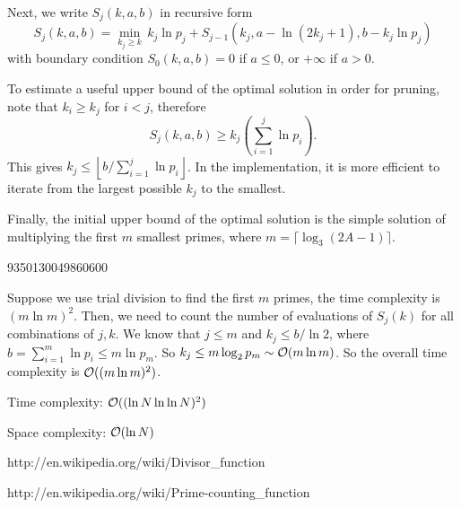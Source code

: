 Next, we write $S_j(k,a,b)$ in recursive form
\[
S_j(k,a,b) = \min_{k_j \ge k} \, k_j \ln p_j + S_{j-1}(k_j, a - \ln(2k_j+1), b-k_j \ln p_j)
\]
with boundary condition $S_0(k,a,b) = 0$ if $a \le 0$, or $+\infty$ if $a>0$.

To estimate a useful upper bound of the optimal solution in order for pruning, note that $k_i \ge k_j$ for $i < j$, therefore
\[
\textstyle
S_j(k,a,b) \ge k_j \left(\sum_{i=1}^{j} \ln p_i\right) .
\]
This gives $k_j \le \left \lfloor b / \sum_{i=1}^{j} \ln p_i \right\rfloor$. In the implementation, it is more efficient to iterate from the largest possible $k_j$ to the smallest.

Finally, the initial upper bound of the optimal solution is the simple solution of multiplying the first $m$ smallest primes, where $m = \lceil \log_3 (2A-1) \rceil$.

\answer

9350130049860600

\complexity

Suppose we use trial division to find the first $m$ primes, the time complexity is $(m \ln m)^2$. Then, we need to count the number of evaluations of $S_j(k)$ for all combinations of $j,k$. We know that $j \le m$ and $k_j \le b / \ln 2$, where $b = \sum_{i=1}^m \ln p_i \le m \ln p_m$. So $k_j \le m \log_2 p_m \sim \mathcal{O}(m \ln m)$. So the overall time complexity is $\mathcal{O}((m \ln m)^2)$.

Time complexity: $\mathcal{O}((\ln N \ln \ln N)^2)$

Space complexity: $\mathcal{O}(\ln N)$


http://en.wikipedia.org/wiki/Divisor\_function

http://en.wikipedia.org/wiki/Prime-counting\_function


